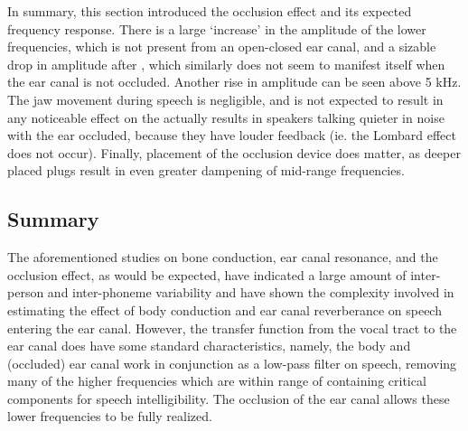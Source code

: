 In summary, %
this section introduced the occlusion effect and its expected frequency response.  There is a large `increase' in the amplitude of the lower frequencies, which is not present from an open-closed ear canal, and a sizable drop in amplitude after \DIFdelbegin {}\DIFdelend \DIFaddbegin {}\DIFaddend , which similarly does not seem to manifest itself when the ear canal is not occluded.  Another rise in amplitude can be seen above 5 kHz.  The jaw movement during speech is negligible, and is not expected to result in any noticeable effect on the \DIFdelbegin {}\DIFdelend \DIFaddbegin {}\DIFaddend actually results in speakers talking quieter in noise with the ear occluded, because they have louder feedback (ie. the Lombard effect does not occur).  Finally, placement of the occlusion device does matter, as deeper placed plugs result in even greater dampening of mid-range frequencies.


\subsection{Summary}

The aforementioned studies on bone conduction, ear canal resonance, and the occlusion effect, as would be expected, have indicated a large amount of inter-person and inter-phoneme variability and have shown the complexity involved in estimating the effect of body conduction and ear canal reverberance on speech entering the ear canal.  However, the transfer function from the vocal tract to the ear canal does have some standard characteristics, namely, the body and (occluded) ear canal work in conjunction as a low-pass filter on speech, removing many of the higher frequencies which are within range of containing critical components for speech intelligibility.  The occlusion of the ear canal allows these lower frequencies to be fully realized.




